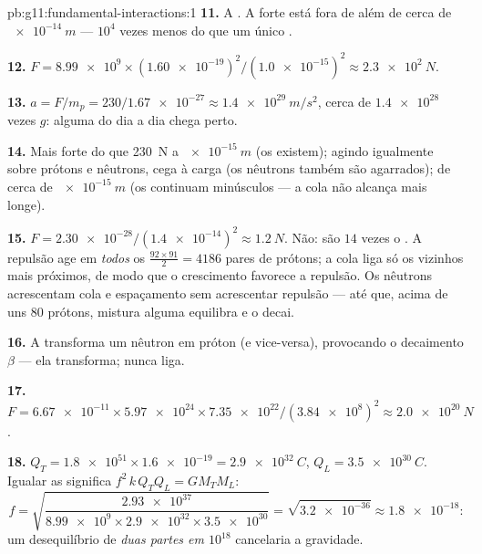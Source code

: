 \begin{solution}{pb:g11:fundamental-interactions:1}
\textbf{11.} A . A  forte está fora de
 além de cerca de $\qty{e-14}{m}$ --- $10^{4}$ vezes menos do que
um único .

\textbf{12.} $F = \num{8.99e9} \times (\num{1.60e-19})^2 /
(\num{1.0e-15})^2 \approx \qty{2.3e2}{N}$.

\textbf{13.} $a = F/m_p = 230/\num{1.67e-27} \approx
\qty{1.4e29}{m/s^2}$, cerca de $\num{1.4e28}$ vezes $g$:  alguma do
dia a dia chega perto.

\textbf{14.} Mais forte do que \qty{230}{N} a $\qty{e-15}{m}$ (os 
existem); agindo igualmente sobre prótons e nêutrons, cega à carga (os
nêutrons também são agarrados);  de cerca de $\qty{e-15}{m}$ (os
 continuam minúsculos --- a cola não alcança mais longe).

\textbf{15.} $F = \num{2.30e-28}/(\num{1.4e-14})^2 \approx \qty{1.2}{N}$.
Não: são $14$ vezes o . A repulsão age em \emph{todos} os
$\frac{92\times91}{2} = 4186$ pares de prótons; a cola liga só os
vizinhos mais próximos, de modo que o crescimento favorece a repulsão. Os
nêutrons acrescentam cola e espaçamento sem acrescentar repulsão --- até
que, acima de uns $80$ prótons, mistura alguma equilibra e o 
decai.

\textbf{16.} A  transforma um nêutron em próton (e
vice-versa), provocando o decaimento $\beta$ --- ela transforma; nunca
liga.

\textbf{17.} $F = \num{6.67e-11} \times \num{5.97e24} \times
\num{7.35e22}/(\num{3.84e8})^2 \approx \qty{2.0e20}{N}$.

\textbf{18.} $Q_T = \num{1.8e51} \times \num{1.6e-19} =
\qty{2.9e32}{C}$, $Q_L = \qty{3.5e30}{C}$. Igualar as  significa
$f^2\,k\,Q_T Q_L = G M_T M_L$:
\[
f = \sqrt{\frac{\num{2.93e37}}{\num{8.99e9} \times \num{2.9e32}
\times \num{3.5e30}}} = \sqrt{\num{3.2e-36}} \approx \num{1.8e-18} :
\]
um desequilíbrio de \emph{duas partes em $10^{18}$} cancelaria a
gravidade.


\end{solution}

